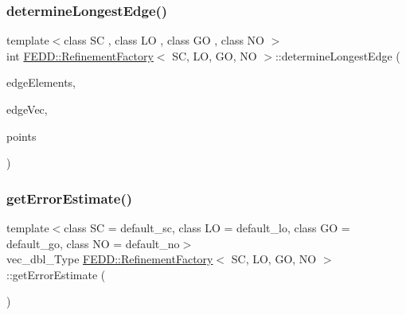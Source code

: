\mbox{\label{classFEDD_1_1RefinementFactory_a383adbeffceada793b6805fb02fa5568}} 
\subsubsection{\texorpdfstring{determine\+Longest\+Edge()}{determineLongestEdge()}}
{\footnotesize\ttfamily template$<$class SC , class LO , class GO , class NO $>$ \\
int \hyperlink{classFEDD_1_1RefinementFactory}{F\+E\+D\+D\+::\+Refinement\+Factory}$<$ SC, LO, GO, NO $>$\+::determine\+Longest\+Edge (\begin{DoxyParamCaption}\item[{\hyperlink{classFEDD_1_1RefinementFactory_ae5285e990ec4632d6188a1280627ad13}{Edge\+Elements\+Ptr\+\_\+\+Type}}]{edge\+Elements,  }\item[{vec\+\_\+int\+\_\+\+Type}]{edge\+Vec,  }\item[{vec2\+D\+\_\+dbl\+\_\+ptr\+\_\+\+Type}]{points }\end{DoxyParamCaption})}

\mbox{\label{classFEDD_1_1RefinementFactory_aecc0c9142abed8227daa43fc5db6ae1c}} 
\subsubsection{\texorpdfstring{get\+Error\+Estimate()}{getErrorEstimate()}}
{\footnotesize\ttfamily template$<$class SC  = default\+\_\+sc, class LO  = default\+\_\+lo, class GO  = default\+\_\+go, class NO  = default\+\_\+no$>$ \\
vec\+\_\+dbl\+\_\+\+Type \hyperlink{classFEDD_1_1RefinementFactory}{F\+E\+D\+D\+::\+Refinement\+Factory}$<$ SC, LO, GO, NO $>$\+::get\+Error\+Estimate (\begin{DoxyParamCaption}{ }\end{DoxyParamCaption})\hspace{0.3cm}{\ttfamily [inline]}}

